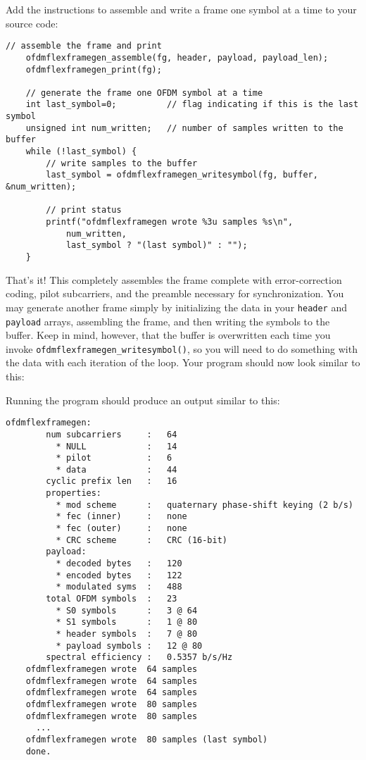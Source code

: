 Add the instructions to assemble and write a frame one symbol at a time
to your source code:
%
\begin{Verbatim}[fontsize=\small]
    // assemble the frame and print
    ofdmflexframegen_assemble(fg, header, payload, payload_len);
    ofdmflexframegen_print(fg);

    // generate the frame one OFDM symbol at a time
    int last_symbol=0;          // flag indicating if this is the last symbol
    unsigned int num_written;   // number of samples written to the buffer
    while (!last_symbol) {
        // write samples to the buffer
        last_symbol = ofdmflexframegen_writesymbol(fg, buffer, &num_written);

        // print status
        printf("ofdmflexframegen wrote %3u samples %s\n",
            num_written,
            last_symbol ? "(last symbol)" : "");
    }
\end{Verbatim}
%
That's it!
This completely assembles the frame complete with error-correction
coding, pilot subcarriers, and the preamble necessary for
synchronization.
You may generate another frame simply by
  initializing the data in your {\tt header} and {\tt payload} arrays,
  assembling the frame,
  and then writing the symbols to the buffer.
Keep in mind, however, that the buffer is overwritten each time you
invoke {\tt ofdmflexframegen\_writesymbol()},
so you will need to do something with the data with each iteration of
the loop.
%
Your program should now look similar to this:
%

%
Running the program should produce an output similar to this:
%
\begin{Verbatim}[fontsize=\small]
    ofdmflexframegen:
        num subcarriers     :   64
          * NULL            :   14
          * pilot           :   6
          * data            :   44
        cyclic prefix len   :   16
        properties:
          * mod scheme      :   quaternary phase-shift keying (2 b/s)
          * fec (inner)     :   none
          * fec (outer)     :   none
          * CRC scheme      :   CRC (16-bit)
        payload:
          * decoded bytes   :   120
          * encoded bytes   :   122
          * modulated syms  :   488
        total OFDM symbols  :   23
          * S0 symbols      :   3 @ 64
          * S1 symbols      :   1 @ 80
          * header symbols  :   7 @ 80
          * payload symbols :   12 @ 80
        spectral efficiency :   0.5357 b/s/Hz
    ofdmflexframegen wrote  64 samples 
    ofdmflexframegen wrote  64 samples 
    ofdmflexframegen wrote  64 samples 
    ofdmflexframegen wrote  80 samples 
    ofdmflexframegen wrote  80 samples 
      ...
    ofdmflexframegen wrote  80 samples (last symbol)
    done.
\end{Verbatim}
